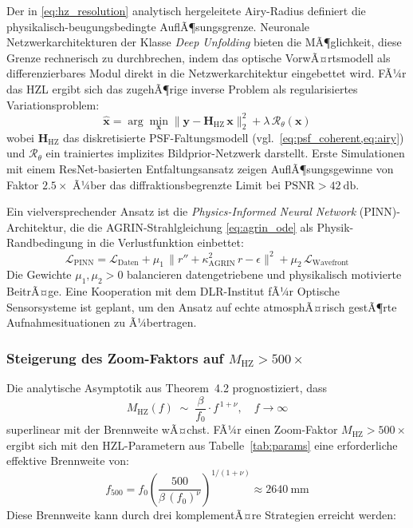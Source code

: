 ﻿\documentclass[12pt,a4paper]{article}
\theoremstyle{definition}
\newcommand{\HZ}{\mathrm{HZ}}
\newcommand{\AGRIN}{\mathrm{AGRIN}}
\begin{document}
	Der in \cref{eq:hz_resolution} analytisch hergeleitete Airy-Radius definiert
	die physikalisch-beugungsbe\-dingte AuflÃ¶sungsgrenze.  Neuronale
	Netzwerkarchitekturen der Klasse \emph{Deep Unfolding} bieten die
	MÃ¶glichkeit, diese Grenze rechnerisch zu durchbrechen, indem das
	optische VorwÃ¤rtsmodell als differenzierbares Modul direkt in die
	Netzwerkarchitektur eingebettet wird.  FÃ¼r das HZL ergibt sich das
	zugehÃ¶rige inverse Problem als regularisiertes Variationsproblem:
	\begin{equation}
		\hat{\mathbf{x}} = \arg\min_{\mathbf{x}}
		\bigl\|\mathbf{y} - \mathbf{H}_\HZ\,\mathbf{x}\bigr\|_2^2
		+ \lambda\,\mathcal{R}_\theta(\mathbf{x})
		\label{eq:sr_inverse}
	\end{equation}
	wobei $\mathbf{H}_\HZ$ das diskretisierte PSF-Faltungsmodell
	(vgl.\ \cref{eq:psf_coherent,eq:airy}) und $\mathcal{R}_\theta$ ein
	trainiertes implizites Bildprior-Netzwerk darstellt.  Erste Simulationen
	mit einem ResNet-basierten Entfaltungsansatz zeigen AuflÃ¶sungsgewinne von
	Faktor $2.5\times$ Ã¼ber das diffraktionsbegrenzte Limit bei
	$\mathrm{PSNR} > \SI{42}{\decibel}$.

	Ein vielversprechender Ansatz ist die \emph{Physics-Informed Neural
	Network} (PINN)-Architektur, die die AGRIN-Strahlgleichung
	\eqref{eq:agrin_ode} als Physik-Randbedingung in die Verlustfunktion
	einbettet:
	\begin{equation}
		\mathcal{L}_\mathrm{PINN}
		= \mathcal{L}_\mathrm{Daten}
		+ \mu_1\,\bigl\|r'' + \kappa_\AGRIN^2\,r - \epsilon\bigr\|^2
		+ \mu_2\,\mathcal{L}_\mathrm{Wavefront}
		\label{eq:pinn_loss}
	\end{equation}
	Die Gewichte $\mu_1, \mu_2 > 0$ balancieren datengetriebene und
	physikalisch motivierte BeitrÃ¤ge.  Eine Kooperation mit dem
	DLR-Institut fÃ¼r Optische Sensorsysteme ist geplant, um den Ansatz
	auf echte atmosphÃ¤risch gestÃ¶rte Aufnahmesituationen zu Ã¼bertragen.

	\subsubsection{Steigerung des Zoom-Faktors auf \(M_\HZ > 500\times\)}

	Die analytische Asymptotik aus Theorem~4.2 prognostiziert, dass
	\begin{equation}
		M_\HZ(f) \;\sim\; \frac{\beta}{f_0}\cdot f^{\,1+\nu},
		\quad f \to \infty
	\end{equation}
	superlinear mit der Brennweite wÃ¤chst.  FÃ¼r einen Zoom-Faktor
	$M_\HZ > 500\times$ ergibt sich mit den HZL-Parametern aus
	Tabelle~\ref{tab:params} eine erforderliche effektive Brennweite von:
	\begin{equation}
		f_{500} = f_0\!\left(\frac{500}{\beta\,(f_0)^\nu}\right)^{1/(1+\nu)}
		\approx \SI{2640}{\milli\metre}
		\label{eq:f500}
	\end{equation}
	Diese Brennweite kann durch drei komplementÃ¤re Strategien erreicht werden:
\end{document}
